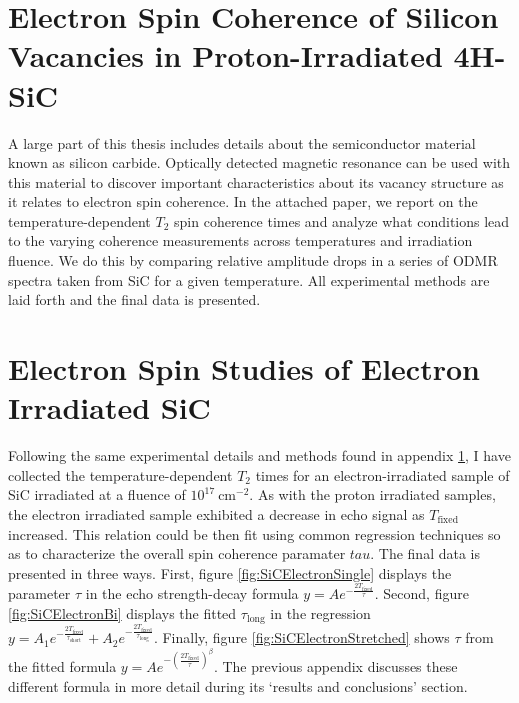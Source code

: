 \documentclass[oneside]{BYUPhys}
\begin{document}
\begin{appendices}

\chapter{Electron Spin Coherence of Silicon Vacancies in Proton-Irradiated 4H-SiC}
\label{sec:appenda}

A large part of this thesis includes details about the semiconductor material known as silicon carbide. Optically detected magnetic resonance can be used with this material to discover important characteristics about its vacancy structure as it relates to electron spin coherence. In the attached paper, we report on the temperature-dependent $T_2$ spin coherence times and analyze what conditions lead to the varying coherence measurements across temperatures and irradiation fluence. We do this by comparing relative amplitude drops in a series of ODMR spectra taken from SiC for a given temperature. All experimental methods are laid forth and the final data is presented.



\chapter{Electron Spin Studies of Electron Irradiated SiC}
\label{sec:appendb}

Following the same experimental details and methods found in appendix \ref{sec:appenda}, I have collected the temperature-dependent $T_2$ times for an electron-irradiated sample of SiC irradiated at a fluence of $10^{17}~\text{cm}^{-2}$. As with the proton irradiated samples, the electron irradiated sample exhibited a decrease in echo signal as $T_{\text{fixed}}$ increased. This relation could be then fit using common regression techniques so as to characterize the overall spin coherence paramater $tau$. The final data is presented in three ways. First, figure \ref{fig:SiCElectronSingle} displays the parameter $\tau$ in the echo strength-decay formula $y=A e^{-\frac{2T_{\text{fixed}}}{\tau}}$. Second, figure \ref{fig:SiCElectronBi} displays the fitted $\tau_{\text{long}}$ in the regression $y=A_{1} e^{-\frac{2T_{\text{fixed}}}{\tau_{\text{short}}}} + A_{2} e^{-\frac{2T_{\text{fixed}}}{\tau_{\text{long}}}}$. Finally, figure \ref{fig:SiCElectronStretched} shows $\tau$ from the fitted formula $y=A e^{-(\frac{2T_{\text{fixed}}}{\tau})^{\beta}}$. The previous appendix discusses these different formula in more detail during its `results and conclusions' section.
 

\end{appendices}
\end{document}
